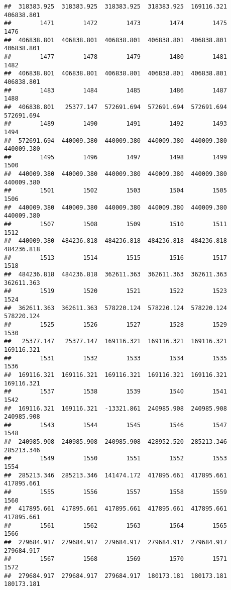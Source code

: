 \documentclass[
]{book}
\begin{document}
\begin{verbatim}
##  318383.925  318383.925  318383.925  318383.925  169116.321  406838.801 
##        1471        1472        1473        1474        1475        1476 
##  406838.801  406838.801  406838.801  406838.801  406838.801  406838.801 
##        1477        1478        1479        1480        1481        1482 
##  406838.801  406838.801  406838.801  406838.801  406838.801  406838.801 
##        1483        1484        1485        1486        1487        1488 
##  406838.801   25377.147  572691.694  572691.694  572691.694  572691.694 
##        1489        1490        1491        1492        1493        1494 
##  572691.694  440009.380  440009.380  440009.380  440009.380  440009.380 
##        1495        1496        1497        1498        1499        1500 
##  440009.380  440009.380  440009.380  440009.380  440009.380  440009.380 
##        1501        1502        1503        1504        1505        1506 
##  440009.380  440009.380  440009.380  440009.380  440009.380  440009.380 
##        1507        1508        1509        1510        1511        1512 
##  440009.380  484236.818  484236.818  484236.818  484236.818  484236.818 
##        1513        1514        1515        1516        1517        1518 
##  484236.818  484236.818  362611.363  362611.363  362611.363  362611.363 
##        1519        1520        1521        1522        1523        1524 
##  362611.363  362611.363  578220.124  578220.124  578220.124  578220.124 
##        1525        1526        1527        1528        1529        1530 
##   25377.147   25377.147  169116.321  169116.321  169116.321  169116.321 
##        1531        1532        1533        1534        1535        1536 
##  169116.321  169116.321  169116.321  169116.321  169116.321  169116.321 
##        1537        1538        1539        1540        1541        1542 
##  169116.321  169116.321  -13321.861  240985.908  240985.908  240985.908 
##        1543        1544        1545        1546        1547        1548 
##  240985.908  240985.908  240985.908  428952.520  285213.346  285213.346 
##        1549        1550        1551        1552        1553        1554 
##  285213.346  285213.346  141474.172  417895.661  417895.661  417895.661 
##        1555        1556        1557        1558        1559        1560 
##  417895.661  417895.661  417895.661  417895.661  417895.661  417895.661 
##        1561        1562        1563        1564        1565        1566 
##  279684.917  279684.917  279684.917  279684.917  279684.917  279684.917 
##        1567        1568        1569        1570        1571        1572 
##  279684.917  279684.917  279684.917  180173.181  180173.181  180173.181 

\end{verbatim}
\end{document}

